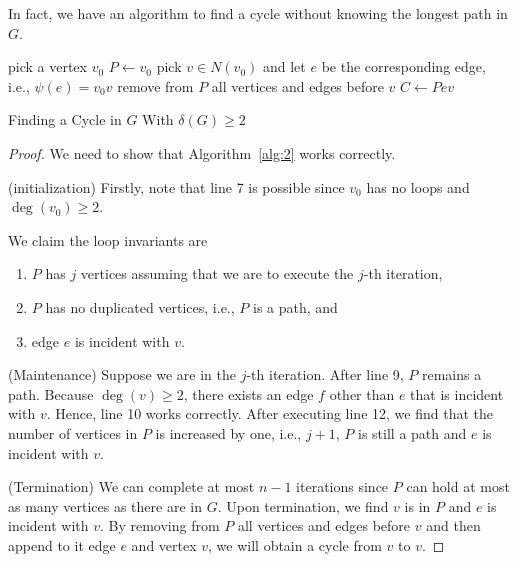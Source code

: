 \documentclass[thmcnt=section, 12pt, color=cyan]{my-elegantbook}
\begin{document}
In fact, we have an algorithm to find a cycle without knowing the longest path in $G$.

\begin{algorithm}[ht]
    pick a vertex $v_0$ \; 
    $P \gets v_0$ \;
    pick $v \in N(v_0)$ and let $e$ be the corresponding edge, i.e., $\psi(e) = v_0 v$ \;
    remove from $P$ all vertices and edges before $v$ \;
    $C \gets P e v$ \;
    \caption{Finding a Cycle in $G$ With $\delta(G) \geq 2$}
    \label{alg:2}
\end{algorithm}

\begin{proof}
    We need to show that Algorithm~\ref{alg:2} works correctly. 
    
    (initialization) Firstly, note that line 7 is possible since $v_0$ has no loops and $\deg(v_0) \geq 2$. 

    We claim the loop invariants are
    \begin{enumerate}
        \item $P$ has $j$ vertices assuming that we are to execute the $j$-th iteration,
        \item $P$ has no duplicated vertices, i.e., $P$ is a path, and
        \item edge $e$ is incident with $v$.
    \end{enumerate}

    (Maintenance) Suppose we are in the $j$-th iteration. After line 9, $P$ remains a path. Because $\deg(v) \geq 2$, there exists an edge $f$ other than $e$ that is incident with $v$. Hence, line 10 works correctly.  After executing line 12, we find that the number of vertices in $P$ is increased by one, i.e., $j+1$, $P$ is still a path and $e$ is incident with $v$.

    (Termination) We can complete at most $n-1$ iterations since $P$ can hold at most as many vertices as there are in $G$. Upon termination, we find $v$ is in $P$ and $e$ is incident with $v$. By removing from $P$ all vertices and edges before $v$ and then append to it edge $e$ and vertex $v$, we will obtain a cycle from $v$ to $v$. 
\end{proof}
\end{document}
